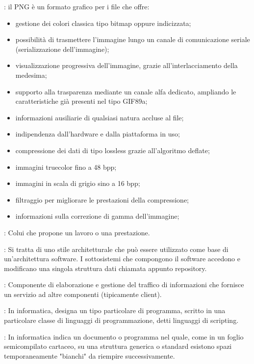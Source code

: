 {		: il PNG è un formato grafico per i file che offre:
  			\begin{itemize}
    		\item gestione dei colori classica tipo bitmap oppure indicizzata;
    		\item possibilità di trasmettere l'immagine lungo un canale di comunicazione seriale (serializzazione dell'immagine);
   			\item visualizzazione progressiva dell'immagine, grazie all'interlacciamento della medesima;
    		\item supporto alla trasparenza mediante un canale alfa dedicato, ampliando le caratteristiche già presenti nel tipo GIF89a;
    		\item informazioni ausiliarie di qualsiasi natura accluse al file;
    		\item indipendenza dall'hardware e dalla piattaforma in uso;
    		\item compressione dei dati di tipo lossless grazie all'algoritmo deflate;
    		\item immagini truecolor fino a 48 bpp;
    		\item immagini in scala di grigio sino a 16 bpp;
    		\item filtraggio per migliorare le prestazioni della compressione;
    		\item informazioni sulla correzione di gamma dell'immagine;
  			\end{itemize}
			
		: Colui che propone un lavoro o una prestazione.	
		

		: Si tratta di uno stile architetturale che può essere utilizzato come base di un'architettura software. I sottosistemi che compongono il software accedono e modificano una singola struttura dati chiamata appunto repository.	
			
		
		: Componente di elaborazione e gestione del traffico di informazioni che fornisce un servizio ad altre componenti (tipicamente client).
		
		: In informatica, designa un tipo particolare di programma, scritto in una particolare classe di linguaggi di programmazione, detti linguaggi di scripting.


		: In informatica indica un documento o programma nel quale, come in un foglio semicompilato cartaceo, su una struttura generica o standard esistono spazi temporaneamente "bianchi" da riempire successivamente.
		
}
